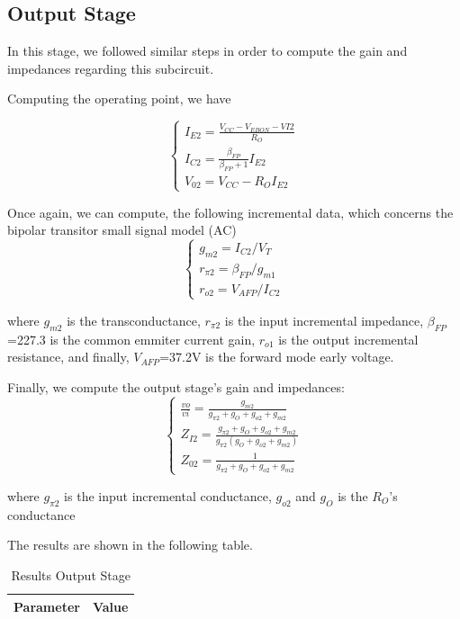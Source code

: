 \subsection{Output Stage}

In this stage, we followed similar steps in order to compute the gain and impedances regarding this subcircuit.

Computing the operating point, we have

\begin{equation}
 \begin{cases}
  I_{E2}=\frac{V_{CC}-V_{EBON}-VI{2}}{R_O} \\
  I_{C2}=\frac{\beta_{FP}}{\beta_{FP}+1}I_{E2}\\
  V_{02}=V_{CC}-R_O I_{E2}
 \end{cases}
\end{equation}

Once again, we can compute, the following incremental data, which concerns the bipolar transitor small signal model (AC)
\begin{equation}
 \begin{cases}
g_{m2}= I_{C2}/V_{T}\\
r_{\pi 2}=\beta_{FP}/g_{m1}\\
r_{o 2}=V_{AFP}/I_{C2}
 \end{cases}
\end{equation}

where $g_{m2}$ is the transconductance, $r_{\pi 2}$ is the input incremental impedance, $\beta_{FP}$=227.3 is the common emmiter current gain, $r_{o 1}$ is the output incremental resistance, and finally, $V_{AFP}$=37.2V is the forward mode early voltage.

Finally, we compute the output stage's gain and impedances:
\begin{equation}
 \begin{cases}
 \frac{vo}{vi}=\frac{g_{m2}}{g_{\pi 2}+g_O+g_{o2}+g_{m2}}\\
  Z_{I2}=\frac{g_{\pi 2}+g_O+g_{o2}+g_{m2}}{g_{\pi 2}(g_O+g_{o2}+g_{m2})}\\
  Z_{02}=\frac{1}{g_{\pi 2}+g_O+g_{o2}+g_{m2}}
 \end{cases}
\end{equation}

where $g_{\pi 2}$ is the input incremental conductance, $g_{o 2}$ and $g_O$ is the $R_O$'s conductance


The results are shown in the following table.

\begin{table}[!htb]
\centering
  \begin{tabular}{|c|c|}
    \hline    
    {\bf Parameter} & {\bf Value} \\ \hline
    
 \end{tabular}
 \caption{Results Output Stage}\label{tab:outputstage}
\end{table}

